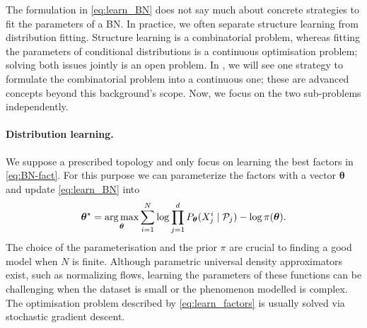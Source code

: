 The formulation in \ref{eq:learn_BN} does not say much about concrete strategies to fit the parameters of a BN. In practice, we often separate structure learning from distribution fitting. Structure learning is a combinatorial problem, whereas fitting the parameters of conditional distributions is a continuous optimisation problem; solving both issues jointly is an open problem. In , we will see one strategy to formulate the combinatorial problem into a continuous one; these are advanced concepts beyond this background's scope. Now, we focus on the two sub-problems independently.

\paragraph{Distribution learning.}
We suppose a prescribed topology and only focus on learning the best factors in \eqref{eq:BN-fact}. For this purpose we can parameterize the factors with a vector $\bm \theta$ and update \eqref{eq:learn_BN} into
\begin{align}
  {\bm \theta}^\star  = \operatorname*{arg\,max}_{\bm \theta} \sum_{i=1}^N \log \prod^d_{j=1}P_{\bm \theta}(X_j^i\mid \mathcal{P}_j) - \log \pi(\bm \theta).
 \label{eq:learn_factors}
\end{align}
The choice of the parameterisation and the prior $\pi$ are crucial to finding a good model when $N$ is finite. Although parametric universal density approximators exist, such as normalizing flows, learning the parameters of these functions can be challenging when the dataset is small or the phenomenon modelled is complex. The optimisation problem described by \eqref{eq:learn_factors} is usually solved via stochastic gradient descent.

